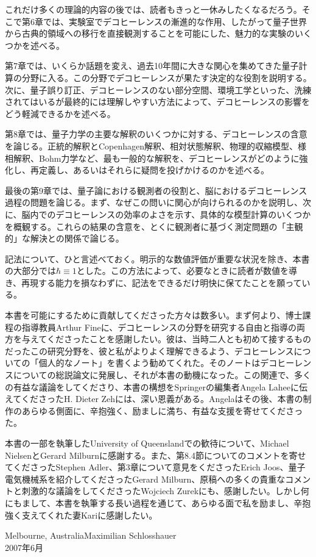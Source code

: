 これだけ多くの理論的内容の後では、読者もきっと一休みしたくなるだろう。そこで第6章では、実験室でデコヒーレンスの漸進的な作用、したがって量子世界から古典的領域への移行を直接観測することを可能にした、魅力的な実験のいくつかを述べる。

第7章では、いくらか話題を変え、過去10年間に大きな関心を集めてきた量子計算の分野に入る。この分野でデコヒーレンスが果たす決定的な役割を説明する。次に、量子誤り訂正、デコヒーレンスのない部分空間、環境工学といった、洗練されてはいるが最終的には理解しやすい方法によって、デコヒーレンスの影響をどう軽減できるかを述べる。

第8章では、量子力学の主要な解釈のいくつかに対する、デコヒーレンスの含意を論じる。正統的解釈とCopenhagen解釈、相対状態解釈、物理的収縮模型、様相解釈、Bohm力学など、最も一般的な解釈を、デコヒーレンスがどのように強化し、再定義し、あるいはそれらに疑問を投げかけるのかを述べる。

最後の第9章では、量子論における観測者の役割と、脳におけるデコヒーレンス過程の問題を論じる。まず、なぜこの問いに関心が向けられるのかを説明し、次に、脳内でのデコヒーレンスの効率のよさを示す、具体的な模型計算のいくつかを概観する。これらの結果の含意を、とくに観測者に基づく測定問題の「主観的」な解決との関係で論じる。

記法について、ひと言述べておく。明示的な数値評価が重要な状況を除き、本書の大部分では$\hbar\equiv1$とした。この方法によって、必要なときに読者が数値を導き、再現する能力を損なわずに、記法をできるだけ明快に保てたことを願っている。

本書を可能にするために貢献してくださった方々は数多い。まず何より、博士課程の指導教員Arthur Fineに、デコヒーレンスの分野を研究する自由と指導の両方を与えてくださったことを感謝したい。彼は、当時二人とも初めて接するものだったこの研究分野を、彼と私がよりよく理解できるよう、デコヒーレンスについての「個人的なノート」を書くよう勧めてくれた。そのノートはデコヒーレンスについての総説論文\cite{ref001}に発展し、それが本書の動機になった。この関連で、多くの有益な議論をしてくださり、本書の構想をSpringerの編集者Angela Laheeに伝えてくださったH. Dieter Zehには、深い恩義がある。Angelaはその後、本書の制作のあらゆる側面に、辛抱強く、励ましに満ち、有益な支援を寄せてくださった。

本書の一部を執筆したUniversity of Queenslandでの歓待について、Michael NielsenとGerard Milburnに感謝する。また、第8.4節についてのコメントを寄せてくださったStephen Adler、第3章について意見をくださったErich Joos、量子電気機械系を紹介してくださったGerard Milburn、原稿への多くの貴重なコメントと刺激的な議論をしてくださったWojciech Zurekにも、感謝したい。しかし何にもまして、本書を執筆する長い過程を通じて、あらゆる面で私を励まし、辛抱強く支えてくれた妻Kariに感謝したい。

\begin{flushleft}Melbourne, Australia\hfill Maximilian Schlosshauer\\2007年6月\end{flushleft}
\clearpage
